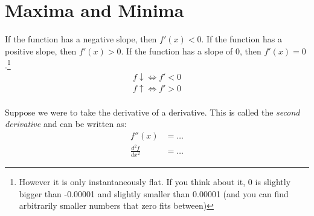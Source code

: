 \chapter{Maxima and Minima}
\label{chap:MaximaAndMinima}
If the function has a negative slope, then $f'(x) < 0$.
If the function has a positive slope, then $f'(x) > 0$.
If the function has a slope of $0$, then $f'(x) = 0$.\footnote{However it is
only instantaneously flat. If you think about it, 0 is slightly bigger than
-0.00001 and slightly smaller than 0.00001 (and you can find arbitrarily
smaller numbers that zero fits between)}
\begin{align}
  f \downarrow \Leftrightarrow f' < 0 \\
  f \uparrow \Leftrightarrow f' > 0 \\
\end{align}

Suppose we were to take the derivative of a derivative. This is called the
\emph{second derivative} and can be written as:
\begin{align}
              f''(x) & = \ldots \nonumber \\
  \frac{d^2 f}{dx^2} & = \ldots \nonumber
\end{align}